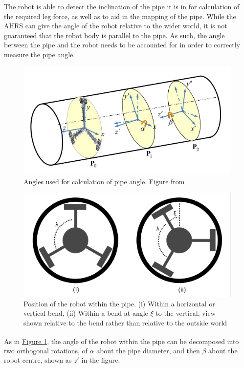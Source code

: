 \documentclass[11pt]{article}		%
\newlength{\imageheight}	 %
\begin{document}
		The robot is able to detect the inclination of the pipe it is in for calculation of the required leg force, as well as to aid in the mapping of the pipe.
		While the AHRS can give the angle of the robot relative to the wider world, it is not guaranteed that the robot body is parallel to the pipe.
		As such, the angle between the pipe and the robot needs to be accounted for in order to correctly measure the pipe angle.
		\\
		\begin{figure}[h]
			\centering
			\includegraphics[height=\imageheight]{pipeOrientation}
			\caption{Angles used for calculation of pipe angle. Figure from \cite{park2010normal}}
			\label{pipeOrientation}
		\end{figure}
		\begin{figure}[h]
			\centering
			\includegraphics[height=\imageheight]{pipeAngle}
			\caption{Position of the robot within the pipe. (i) Within a horizontal or vertical bend, (ii) Within a bend at angle $\xi$ to the vertical, view shown relative to the bend rather than relative to the outside world}
			\label{pipeAngle}
		\end{figure}
		As in \hyperref[pipeOrientation]{Figure \ref*{pipeOrientation}}\textsuperscript{\cite{park2010normal}}, the angle of the robot within the pipe can be decomposed into two orthogonal rotations, of $\alpha$ about the pipe diameter, and then $\beta$ about the robot centre, shown as $z'$ in the figure.
\end{document}
